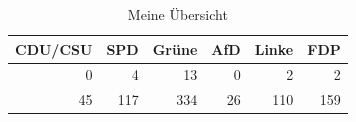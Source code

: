 \begin{table}
\caption{Meine Übersicht}
\label{tab:meine_tabelle}
\begin{tabular}{rrrrrr}
\toprule
CDU/CSU & SPD & Grüne & AfD & Linke & FDP \\
\midrule
0 & 4 & 13 & 0 & 2 & 2 \\
45 & 117 & 334 & 26 & 110 & 159 \\
\bottomrule
\end{tabular}
\end{table}
